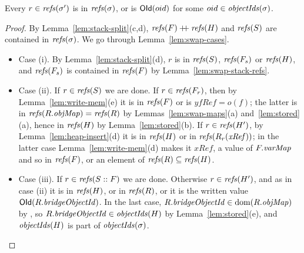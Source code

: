 \begin{lemma}
\label{lem:swap-refs}
Every $r \in \mathit{refs}(\sigma')$ is in $\mathit{refs}(\sigma)$, or is $\mathsf{OId}(oid)$ for some $oid \in \mathit{objectIds}(\sigma)$.
\end{lemma}
\begin{proof}
By Lemma~\ref{lem:stack-split}(c,d), $\mathit{refs}(F) \mathbin{+\!\!+} \mathit{refs}(H)$ and $\mathit{refs}(S)$ are contained in
$\mathit{refs}(\sigma)$. We go through Lemma~\ref{lem:swap-cases}.
\begin{itemize}[nosep]
  \item Case (i). By Lemma~\ref{lem:stack-split}(d), $r$ is in $\mathit{refs}(S)$, $\mathit{refs}(F_s)$ or
    $\mathit{refs}(H)$, and $\mathit{refs}(F_s)$ is contained in $\mathit{refs}(F)$ by Lemma~\ref{lem:swap-stack-refs}.
  \item Case (ii). If $r \in \mathit{refs}(S)$ we are done. If $r \in \mathit{refs}(F_r)$, then by
    Lemma~\ref{lem:write-mem}(e) it is in $\mathit{refs}(F)$ or is $\mathit{yfRef} = o(f)$; the latter is in
    $\mathit{refs}(R.\mathit{objMap}) = \mathit{refs}(R)$ by Lemmas~\ref{lem:swap-maps}(a) and~\ref{lem:stored}(a), hence in
    $\mathit{refs}(H)$ by Lemma~\ref{lem:stored}(b). If $r \in \mathit{refs}(H')$, by Lemma~\ref{lem:heap-insert}(d)
    it is in $\mathit{refs}(H)$ or in $\mathit{refs}(R_r(\mathit{xRef}))$; in the latter case
    Lemma~\ref{lem:write-mem}(d) makes it $\mathit{xRef}$, a value of $F.\mathit{varMap}$ and so in $\mathit{refs}(F)$,
    or an element of $\mathit{refs}(R) \subseteq \mathit{refs}(H)$.
  \item Case (iii). If $r \in \mathit{refs}(S :: F)$ we are done. Otherwise $r \in \mathit{refs}(H')$, and as in
    case (ii) it is in $\mathit{refs}(H)$, or in $\mathit{refs}(R)$, or it is the written value $\mathsf{OId}(R.\mathit{bridgeObjectId})$. In
    the last case, $R.\mathit{bridgeObjectId} \in \mathrm{dom}(R.\mathit{objMap})$ by , so $R.\mathit{bridgeObjectId} \in \mathit{objectIds}(H)$ by
    Lemma~\ref{lem:stored}(e), and $\mathit{objectIds}(H)$ is part of $\mathit{objectIds}(\sigma)$. \qedhere
\end{itemize}
\end{proof}

